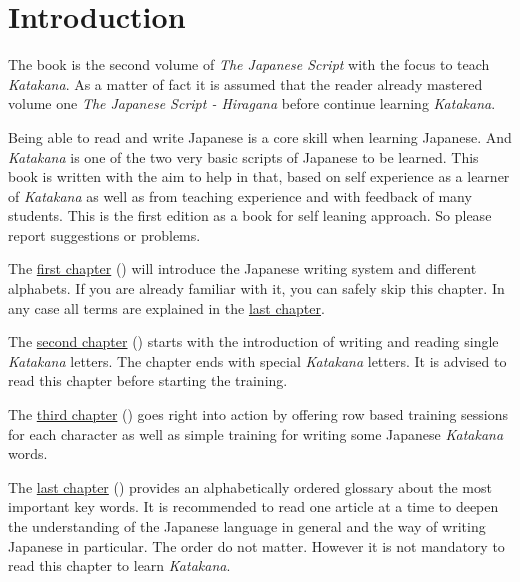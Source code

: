 \chapter*{Introduction}
\label{chap:Introduction}

The book is the second volume of \textit{The Japanese Script} with the focus to
teach \textit{Katakana}. As a matter of fact it is assumed that the reader
already mastered volume one \textit{The Japanese Script - Hiragana} before
continue learning \textit{Katakana}.

Being able to read and write Japanese is a core skill when learning Japanese.
And \textit{Katakana} is one of the two very basic scripts of Japanese to be
learned.  This book is written with the aim to help in that, based on self
experience as a learner of \textit{Katakana} as well as from teaching
experience and with feedback of many students. This is the first edition as a
book for self leaning approach. So please report suggestions or problems.

The \hyperref[chap:JapaneseWritingSystem]{first chapter}
() will introduce the Japanese writing
system and different alphabets. If you are already familiar with it, you can
safely skip this chapter. In any case all terms are explained in the
\hyperref[chap:Terminology]{last chapter}.

The \hyperref[chap:TheWayToWriteKatakana]{second chapter}
() starts with the introduction of writing
and reading single \textit{Katakana} letters. The chapter ends with special
\textit{Katakana} letters. It is advised to read this chapter before starting
the training.

The \hyperref[chap:KatakanaTraining]{third chapter}
() goes right into action by offering row based
training sessions for each character as well as simple training for writing
some Japanese \textit{Katakana} words.

The \hyperref[chap:Terminology]{last chapter} ()
provides an alphabetically ordered glossary about the most important key words.
It is recommended to read one article at a time to deepen the understanding of
the Japanese language in general and the way of writing Japanese in particular.
The order do not matter. However it is not mandatory to read this chapter to
learn\textit{ Katakana}.


